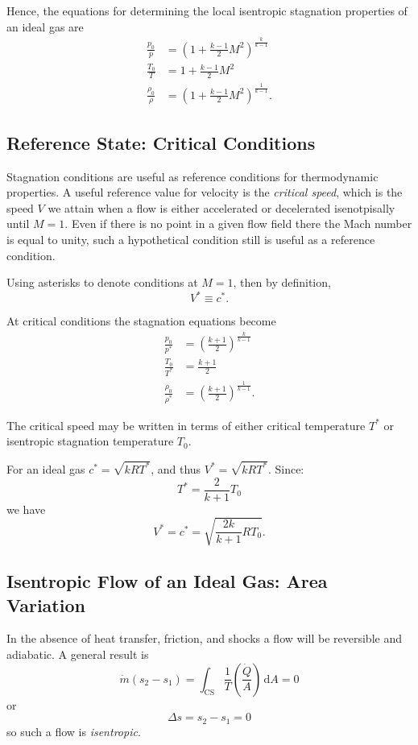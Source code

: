 Hence, the equations for determining the local isentropic stagnation properties of an ideal gas are
\begin{align}
  \frac{p_0}{p} &= \left( 1 + \frac{k-1}{2}M^2 \right)^{\frac{k}{k-1}} \\
  \frac{T_0}{T} &= 1 + \frac{k-1}{2}M^2 \\
  \frac{\rho_0}{\rho} &= \left( 1 + \frac{k-1}{2}M^2 \right)^{\frac{1}{k-1}}
.\end{align}


\subsection{Reference State: Critical Conditions}
Stagnation conditions are useful as reference conditions for thermodynamic properties.
A useful reference value for velocity is the \textit{critical speed}, which is the speed $V$ we attain when a flow is either accelerated or decelerated isenotpisally until $M = 1$.
Even if there is no point in a given flow field there the Mach number is equal to unity, such a hypothetical condition still is useful as a reference condition.

Using asterisks to denote conditions at $M = 1$, then by definition,
\begin{equation*}
  V^{*} \equiv c^{*}
.\end{equation*}

At critical conditions the stagnation equations become
\begin{align}
  \frac{p_0}{p^{*}} &= \left( \frac{k+1}{2} \right)^{\frac{k}{k-1}} \\
  \frac{T_0}{T^{*}} &= \frac{k+1}{2} \\
  \frac{\rho_0}{\rho^{*}} &= \left( \frac{k+1}{2} \right)^{\frac{1}{k-1}}
.\end{align}

The critical speed may be written in terms of either critical temperature $T^{*}$ or isentropic stagnation temperature $T_0$.

For an ideal gas $c^{*} = \sqrt{kRT^{*}}$, and thus $V^{*} = \sqrt{kRT^{*}}$.
Since:
\begin{equation*}
  T^{*} = \frac{2}{k+1}T_0
\end{equation*}
we have
\begin{equation*}
  V^{*} = c^{*} = \sqrt{\frac{2k}{k+1} RT_0}
.\end{equation*}


\subsection{Isentropic Flow of an Ideal Gas: Area Variation}
In the absence of heat transfer, friction, and shocks a flow will be reversible and adiabatic.
A general result is
\begin{equation*}
  \dot{m} (s_2 - s_1 ) = \int_{\mathrm{CS}} \frac{1}{T} \left( \frac{\dot{Q}}{A} \right) \, \mathrm{d}A = 0
\end{equation*}
or
\begin{equation*}
  \Delta s = s_2 - s_1 = 0
\end{equation*}
so such a flow is \textit{isentropic}.

